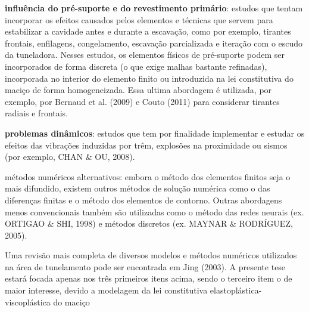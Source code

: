 \begin{alineas}
	\item \textbf{influência do pré-suporte e do revestimento primário}: estudos que tentam incorporar os efeitos causados pelos elementos e técnicas que servem para estabilizar a cavidade antes e durante a escavação, como por exemplo, tirantes frontais, enfilagens, congelamento, escavação parcializada e iteração com o escudo da tuneladora. Nesses estudos, os elementos físicos de pré-suporte podem ser incorporados de forma discreta (o que exige malhas bastante refinadas), incorporada no interior do elemento finito ou introduzida na lei constitutiva do maciço de forma homogeneizada. Essa ultima abordagem é utilizada, por exemplo, por Bernaud et al. (2009) e Couto (2011) para considerar tirantes radiais e frontais.
	
	\item \textbf{problemas dinâmicos}: estudos que tem por finalidade implementar e estudar os efeitos das vibrações induzidas por trêm, explosões na proximidade ou sismos (por exemplo, CHAN \& OU, 2008).
	
	\item métodos numéricos alternativos: embora o método dos elementos finitos seja o mais difundido, existem outros métodos de solução numérica como o das diferenças finitas e o método dos elementos de contorno. Outras abordagens menos convencionais também são utilizadas como o método das redes neurais (ex. ORTIGAO \& SHI, 1998) e métodos discretos (ex. MAYNAR \& RODRÍGUEZ, 2005).

\end{alineas}

Uma revisão mais completa de diversos modelos e métodos numéricos utilizados na área de tunelamento pode ser encontrada em Jing (2003). A presente tese estará focada apenas nos três primeiros itens acima, sendo o terceiro item o de maior interesse, devido a modelagem da lei constitutiva elastoplástica-viscoplástica do maciço